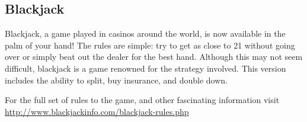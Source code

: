 \subsection{Blackjack}

Blackjack, a game played in casinos around the world, is now available
in the palm of your hand! The rules are simple: try to get as close to 21
without going over or simply beat out the dealer for the best hand.
Although this may not seem difficult, blackjack is a game renowned for the
strategy involved. This version includes the ability to split, buy insurance,
and double down.

For the full set of rules to the game, and other fascinating information
visit\\
\url{http://www.blackjackinfo.com/blackjack-rules.php}

